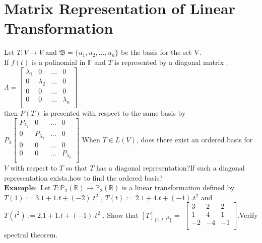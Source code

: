 \documentclass[12pt]{article}
\theoremstyle{definition}
\begin{document}
	\section{Matrix Representation of Linear Transformation}
	
	Let $ T:V\to V $ and $ \mathfrak{B} =\{u_{1},u_{2},...,u_{n}\} $ be the basis for the set V.\\
	If $f(t)$ is a polinomial in $\mathbb{F}$ and $T$ is represented by a diagonal matrix . 
	$
	\Lambda =
	\begin{bmatrix}
	\lambda_{1} & 0 &... & 0 \\
	0 & \lambda_2 & ... & 0 \\
	0 & 0 & ... & 0 \\
	0 & 0 & ... &  \lambda_n  \\
	\end{bmatrix}
	$
	\\
	then $P(T)$ is presented with respect to the same basis by 
	$
	P_{\lambda}
	\begin{bmatrix}
	P_{\lambda_{1}} & 0 &... & 0 \\
	0 & P_{\lambda_2} & ... & 0 \\
	0 & 0 & ... & 0 \\
	0 & 0 & ... &  P_{\lambda_n}  \\
	\end{bmatrix}
	$
	When $T \in L(V)$, does there exist an ordered basis for $V$ with respect to $T$ so that $T$ has a diagonal representation?If such a diagonal representation exists,how to find the ordered basis?\\
	$\mathbf{Example:}$
	Let $ T : \mathbb{P}_{2}(\mathbb{R})\to\mathbb{P}_{2}(\mathbb{R}) $ is a linear transformation defined by $ T(1):=3.1+1.t+(-2).t^2$ , $T(t):=2.1+4.t+(-4).t^2$  and $T(t^2):=2.1+1.t+(-1).t^2 $ . Show that $[T]_{\{1,t,t^2\}}=$
	$	
	\begin{bmatrix}
	3&2&2\\
	1&4&1\\
	-2&-4&-1\\
	\end{bmatrix}	
	$.Verify spectral theorem.\\
\end{document}

